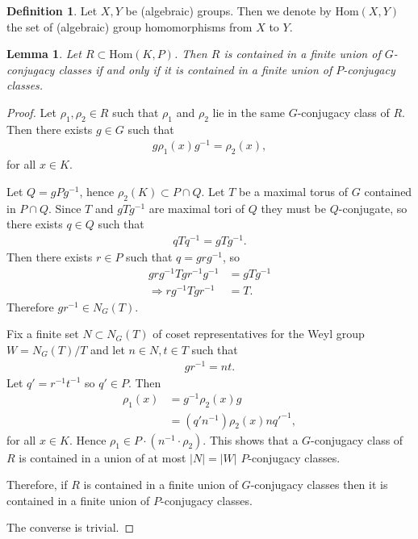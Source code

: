 \documentclass[12pt]{amsart}
\numberwithin{equation}{section}
\newtheorem{lem}[equation]{Lemma}
\theoremstyle{definition}
\newtheorem{defn}[equation]{Definition}
\theoremstyle{remark}
\theoremstyle{remark}
\begin{document}
\bigskip
\begin{defn} Let $X,Y$ be (algebraic) groups. Then we denote by $\mathrm{Hom}(X, Y)$ the set of (algebraic) group homomorphisms from $X$ to $Y$.
\end{defn}

\begin{lem} Let $R \subset \mathrm{Hom}(K, P)$. Then $R$ is contained in a finite union of $G$-conjugacy classes if and only if it is contained in a finite union of $P$-conjugacy classes.
  \label{lem:GPconj}
\end{lem}
\begin{proof}
	Let $\rho_1, \rho_2 \in R$ such that $\rho_1$ and $\rho_2$ lie in the same $G$-conjugacy class of $R$. Then there exists $g\in G$ such that
	\begin{align*}
		g \rho_1(x) g^{-1} = \rho_2(x),
	\end{align*}
for all $x \in K$.
	
	Let $Q = gPg^{-1}$, hence $\rho_2(K) \subset P \cap Q$.
	Let $T$ be a maximal torus of $G$ contained in $P\cap Q$. Since $T$ and $gTg^{-1}$ are maximal tori of $Q$ they must be $Q$-conjugate, so there exists $q\in Q$ such that
	\begin{align*}
		qTq^{-1} = gTg^{-1}.
	\end{align*}
	Then there exists $r\in P$ such that $q = grg^{-1}$, so
	\begin{align*}
		grg^{-1}Tgr^{-1}g^{-1} &= gTg^{-1} \\
		\Rightarrow rg^{-1}Tgr^{-1} &= T.
	\end{align*}
	Therefore $gr^{-1} \in N_G(T)$. 

	Fix a finite set $N \subset N_G(T)$ of coset representatives for the Weyl group $W = N_G(T)/T$ and let $n \in N, t \in T$ such that
	\begin{align*}
		gr^{-1} = nt.
	\end{align*}
	Let $q' = r^{-1}t^{-1}$ so $q' \in P$. Then
	\begin{align*}
		\rho_1(x) &= g^{-1} \rho_2(x) g\\
		&= (q'n^{-1}) \rho_2(x) nq'^{-1},
	\end{align*}
	for all $x \in K$. Hence $\rho_1\in P\cdot(n^{-1}\cdot \rho_2)$.
	This shows 
	that a $G$-conjugacy class of $R$ is contained in a union of at most $|N| = |W|$ $P$-conjugacy classes.

	Therefore, if $R$ is contained in a finite union of $G$-conjugacy classes then it is contained in a finite union of $P$-conjugacy classes. 

	The converse is trivial.
\end{proof}
\end{document}
